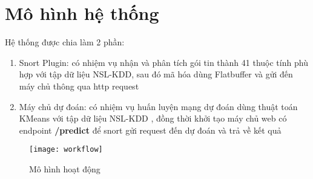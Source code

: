 \section{Mô hình hệ thống}
Hệ thống được chia làm 2 phần:
\begin{enumerate}
    \item Snort Plugin: có nhiệm vụ nhận và phân tích gói tin thành 41 thuộc tính \cite{featureextraction} phù hợp với tập dữ liệu
    NSL-KDD, sau đó mã hóa dùng Flatbuffer và gửi đến máy chủ thông qua http request
    \item Máy chủ dự đoán: có nhiệm vụ huấn luyện mạng dự đoán dùng thuật toán KMeans với tập dữ liệu NSL-KDD \cite{kmeanswithnslkdd},
    đồng thời khởi tạo máy chủ web có endpoint \textbf{/predict} để snort gửi request đến dự đoán
    và trả về kết quả
\end{enumerate}
\begin{figure}[!htbp]
    \centering
    \texttt{[image: workflow]}
    \caption{Mô hình hoạt động}
    \label{fig:x cubed graph}
\end{figure}
\FloatBarrier
